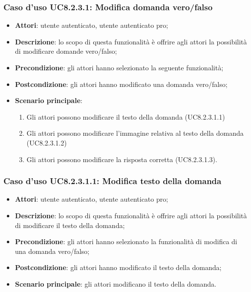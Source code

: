 \subsubsection{Caso d'uso UC8.2.3.1: Modifica domanda vero/falso}
	\begin{itemize}
		\item
			\textbf{Attori}: utente autenticato, utente autenticato pro;
		\item		
			\textbf{Descrizione}: lo scopo di questa funzionalità è offrire agli attori la possibilità di modificare domande vero/falso;
		\item
			\textbf{Precondizione}: gli attori hanno selezionato la seguente funzionalità; 
		\item
			\textbf{Postcondizione}: gli attori hanno modificato una domanda vero/falso;
		\item
			\textbf{Scenario principale}:
	       		\begin{enumerate}
	       			\item
	       			Gli attori possono modificare il testo della domanda (UC8.2.3.1.1)
	       			\item
	       			Gli attori possono modificare l'immagine relativa al testo della domanda (UC8.2.3.1.2)
					\item
					Gli attori possono modificare la risposta corretta (UC8.2.3.1.3).
	 			\end{enumerate}
	\end{itemize}
	
\subsubsection{Caso d'uso UC8.2.3.1.1: Modifica testo della domanda}
	\begin{itemize}
		\item
			\textbf{Attori}: utente autenticato, utente autenticato pro;
		\item		
			\textbf{Descrizione}: lo scopo di questa funzionalità è offrire agli attori la possibilità di modificare il testo della domanda;
		\item
			\textbf{Precondizione}: gli attori hanno selezionato la funzionalità di modifica di una domanda vero/falso; 
		\item
			\textbf{Postcondizione}: gli attori hanno modificato il testo della domanda;
		\item
			\textbf{Scenario principale}: gli attori modificano il testo della domanda. 		
	\end{itemize}
	
